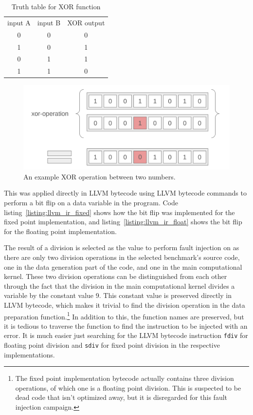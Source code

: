 \begin{table}[htb]
    \centering
\caption{Truth table for XOR function}
    \label{table:xor_truth_table}
\begin{tabular}{c|c|c}
     input A& input B& XOR output \\
     0&0&0\\
     1&0&1\\
     0&1&1\\
     1&1&0
\end{tabular}
    
\end{table}



\begin{figure}[h!]
    \centering
    \includegraphics[width=0.75\linewidth]{Images/xor_operation.png}
    \caption{An example XOR operation between two numbers.}
    \label{fig:xor_operation}
\end{figure}

This was applied directly in LLVM bytecode using LLVM bytecode commands to perform a bit flip on a data variable in the program. Code listing~\ref{listing:llvm_ir_fixed} shows how the bit flip was implemented for the fixed point implementation, and listing~\ref{listing:llvm_ir_float} shows the bit flip for the floating point implementation.



The result of a division is selected as the value to perform fault injection on as there are only two division operations in the selected benchmark's source code, one in the data generation part of the code, and one in the main computational kernel. These two division operations can be distinguished from each other through the fact that the division in the main computational kernel divides a variable by the constant value 9. This constant value is preserved directly in LLVM bytecode, which makes it trivial to find the division operation in the data preparation function.\footnote{The fixed point implementation bytecode actually contains three division operations, of which one is a floating point division. This is suspected to be dead code that isn't optimized away, but it is disregarded for this fault injection campaign.}
In addition to this, the function names are preserved, but it is tedious to traverse the function to find the instruction to be injected with an error. It is much easier just searching for the LLVM bytecode instruction {\tt fdiv} for floating point division and {\tt sdiv} for fixed point division in the respective implementations.

